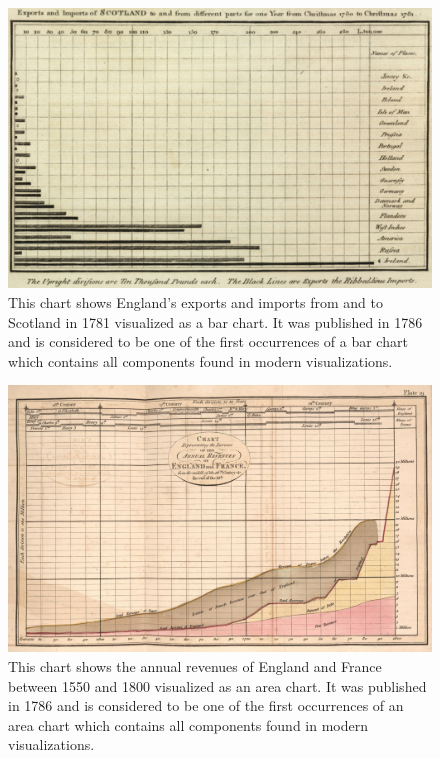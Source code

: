\begin{figure}[tp]
\centering
\includegraphics[keepaspectratio,width=\linewidth,height=\fullh / 3]{images/playfair-bar-chart.png}
\caption[Bar Chart by William Playfair from 1786]{
  This chart shows England's exports and imports from and to Scotland in 1781 visualized as a bar chart.
  It was published in 1786 and is considered to be one of the first occurrences of a bar chart which contains all components found in modern visualizations.
}
\label{fig:PlayfairBarChart}
\end{figure}

\begin{figure}[tp]
\centering
\includegraphics[keepaspectratio,width=\linewidth,height=\fullh / 3]{images/playfair-area-chart.png}
\caption[Area Chart by William Playfair from 1786]{
  This chart shows the annual revenues of England and France between 1550 and 1800 visualized as an area chart.
  It was published in 1786 and is considered to be one of the first occurrences of an area chart which contains all components found in modern visualizations.
}
\label{fig:PlayfairAreaChart}
\end{figure}

